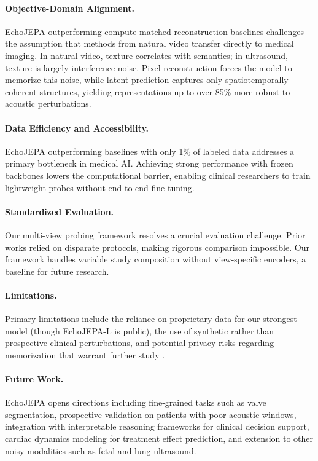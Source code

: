 \documentclass{article}
\theoremstyle{plain}
\theoremstyle{definition}
\theoremstyle{remark}
\begin{document}
\paragraph{Objective-Domain Alignment.}
EchoJEPA outperforming compute-matched reconstruction baselines challenges the assumption that methods from natural video transfer directly to medical imaging. In natural video, texture correlates with semantics; in ultrasound, texture is largely interference noise. Pixel reconstruction forces the model to memorize this noise, while latent prediction captures only spatiotemporally coherent structures, yielding representations up to over 85\% more robust to acoustic perturbations.

\paragraph{Data Efficiency and Accessibility.}
EchoJEPA outperforming baselines with only 1\% of labeled data addresses a primary bottleneck in medical AI. Achieving strong performance with frozen backbones lowers the computational barrier, enabling clinical researchers to train lightweight probes without end-to-end fine-tuning.

\paragraph{Standardized Evaluation.}
Our multi-view probing framework resolves a crucial evaluation challenge. Prior works \citep{panecho, echoprime} relied on disparate protocols, making rigorous comparison impossible. Our framework handles variable study composition without view-specific encoders, a baseline for future research.

\paragraph{Limitations.}
Primary limitations include the reliance on proprietary data for our strongest model (though EchoJEPA-L is public), the use of synthetic rather than prospective clinical perturbations, and potential privacy risks regarding memorization that warrant further study \citep{tonekaboni2025investigationmemorizationriskhealthcare}.

\paragraph{Future Work.}
EchoJEPA opens directions including fine-grained tasks such as valve 
segmentation, prospective validation on patients with poor acoustic 
windows, integration with interpretable reasoning frameworks for 
clinical decision support, cardiac dynamics modeling 
for treatment effect prediction, and extension to other noisy modalities 
such as fetal and lung ultrasound.
\end{document}
